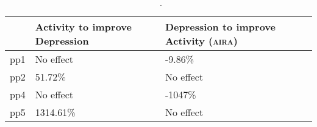 \begin{table}[ht]
\centering
\begin{tabular}{rll}
  \toprule
 & Activity to improve Depression & Depression to improve Activity (\textsc{aira}) \\ 
  \midrule
pp1 & No effect & -9.86\% \\ 
  pp2 & 51.72\% & No effect \\ 
  pp4 & No effect & -1047\% \\ 
  pp5 & 1314.61\% & No effect \\ 
   \bottomrule
\end{tabular}
\caption{\citeauthor{RefWorks:4}~\cite{RefWorks:4}.} 
\label{tab:effects}
\end{table}

